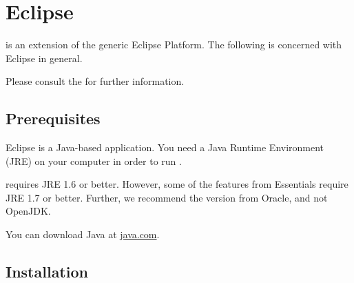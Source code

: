 % 

\section{Eclipse}
\label{sec:eclipse}

\pror{} is an extension of the generic Eclipse Platform.  The following is concerned with Eclipse in general.

\begin{info}
Please consult the 
 for further information.
\end{info}

\subsection{Prerequisites}

Eclipse is a Java-based application.  You need a Java Runtime Environment (JRE) on your computer in order to run \pror{}.

\pror{} requires JRE 1.6 or better.  However, some of the features from Essentials require JRE 1.7 or better.  Further, we recommend the version from Oracle, and not OpenJDK.

\begin{info}
You can download Java at \href{https://www.java.com}{java.com}.
\end{info}

\subsection{Installation}
\label{sec:installation}


